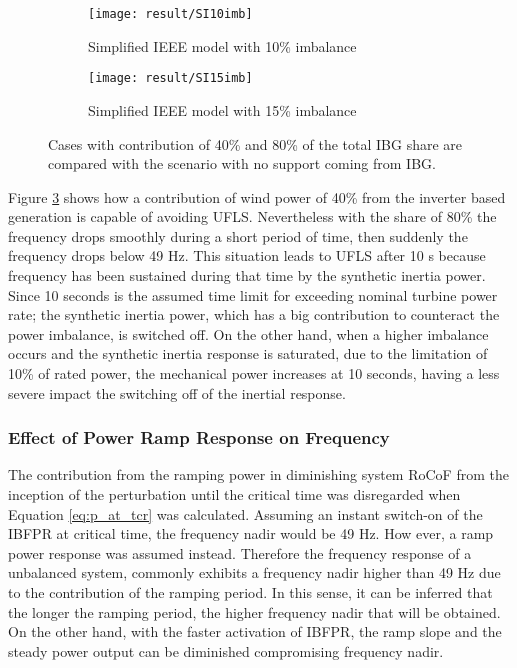 \begin{figure}[h]
	\centering
	\begin{subfigure}[h]{0.49\textwidth}
		\centering
		\texttt{[image: result/SI10imb]}
		\caption{Simplified IEEE model with 10\% imbalance}
		\label{fig:res_ieee_fr10imb}
	\end{subfigure}
	\hfill
	\begin{subfigure}[h]{0.49\textwidth}
		\centering
		\texttt{[image: result/SI15imb]}
		\caption{Simplified IEEE model with 15\% imbalance}
		\label{fig:res_ieee_fr15imb}
	\end{subfigure}
	\caption{Cases with contribution of 40\% and 80\% of the total IBG share are compared with the scenario with no support coming from IBG.}
\end{figure}


Figure \ref{fig:res_ieee_fr15imb} shows how a contribution of wind power of 40\% from the inverter based generation is capable of avoiding UFLS. Nevertheless with the share of 80\% the frequency drops smoothly during a short period of time, then suddenly the frequency drops below 49 Hz. This situation leads to UFLS after 10 s because frequency has been sustained during that time by the synthetic inertia power. Since 10 seconds is the assumed time limit for exceeding nominal turbine power rate; the synthetic inertia power, which has a big contribution to counteract the power imbalance, is switched off. On the other hand, when a higher imbalance occurs and the synthetic inertia response is saturated, due to the limitation of 10\% of rated power, the mechanical power increases at 10 seconds, having a less severe impact the switching off of the inertial response.


\subsubsection{Effect of Power Ramp Response on Frequency}

The contribution from the ramping power in diminishing system RoCoF from the inception of the perturbation until the critical time was disregarded when Equation \eqref{eq:p_at_tcr} was calculated. Assuming an instant switch-on of the IBFPR at critical time, the frequency nadir would be 49 Hz. How ever, a ramp power response was assumed instead. Therefore the frequency response of a unbalanced system, commonly exhibits a frequency nadir higher than 49 Hz due to the contribution of the ramping period. In this sense, it can be inferred that the longer the ramping period, the higher frequency nadir that will be obtained. On the other hand, with the faster activation of IBFPR, the ramp slope and the steady power output can be diminished compromising frequency nadir. 


